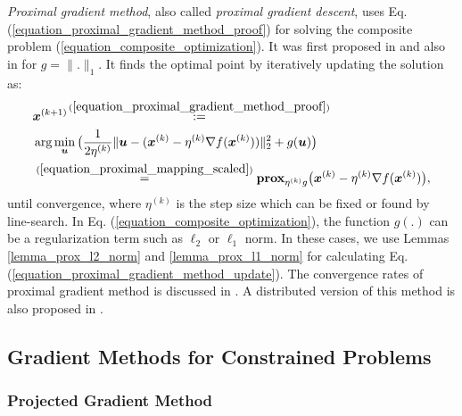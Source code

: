 \documentclass[lang=cn,10pt]{gorgeousnbook}
\numberwithin{equation}{section}%
\numberwithin{figure}{section}%
\begin{document}
\textit{Proximal gradient method}, also called \textit{proximal gradient descent}, uses Eq. (\ref{equation_proximal_gradient_method_proof}) for solving the composite problem (\ref{equation_composite_optimization}). 
It was first proposed in \cite{nesterov2013gradient} and also in \cite{beck2009fast} for $g = \|.\|_1$.
It finds the optimal point by iteratively updating the solution as:
\begin{align}
&\boldsymbol{x}^{(k+1)}\! \overset{(\ref{equation_proximal_gradient_method_proof})}{:=}\! \nonumber\\
&\arg \min_{\boldsymbol{u}} \big(\frac{1}{2\eta^{(k)}} \|\boldsymbol{u} - (\boldsymbol{x}^{(k)} - \eta^{(k)} \nabla f(\boldsymbol{x}^{(k)}))\|_2^2 + g(\boldsymbol{u})\big) \nonumber\\
&\overset{(\ref{equation_proximal_mapping_scaled})}{=} \textbf{prox}_{\eta^{(k)} g}\big(\boldsymbol{x}^{(k)} - \eta^{(k)} \nabla f(\boldsymbol{x}^{(k)})\big), \label{equation_proximal_gradient_method_update}
\end{align}
until convergence, where $\eta^{(k)}$ is the step size which can be fixed or found by line-search. 
In Eq. (\ref{equation_composite_optimization}), the function $g(.)$ can be a regularization term such as $\ell_2$ or $\ell_1$ norm. In these cases, we use Lemmas \ref{lemma_prox_l2_norm} and \ref{lemma_prox_l1_norm} for calculating Eq. (\ref{equation_proximal_gradient_method_update}). 
The convergence rates of proximal gradient method is discussed in \cite{schmidt2011convergence}.
A distributed version of this method is also proposed in \cite{chen2012fast}.

\subsection{Gradient Methods for Constrained Problems}

\subsubsection{Projected Gradient Method}\label{section_projected_gradient_method}



\end{document}
